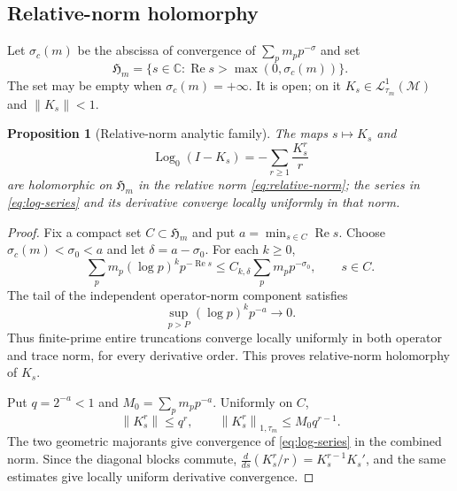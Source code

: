 \documentclass[11pt,a4paper]{article}
\newtheorem{proposition}[theorem]{Proposition}
\theoremstyle{definition}
\newcommand{\C}{\mathbb C}
\newcommand{\M}{\mathcal M}
\newcommand{\Lc}{\mathcal L}
\newcommand{\Log}{\operatorname{Log}}
\newcommand{\norm}[1]{\left\lVert #1\right\rVert}
\begin{document}
\subsection{Relative-norm holomorphy}

Let $\sigma_c(m)$ be the abscissa of convergence of
$\sum_pm_pp^{-\sigma}$ and set
\begin{equation}
 \mathfrak H_m
 =\{s\in\C:\operatorname{Re}s>\max(0,\sigma_c(m))\}.
 \label{eq:Hm}
\end{equation}
The set may be empty when $\sigma_c(m)=+\infty$.  It is open; on it
$K_s\in\Lc^1_{\tau_m}(\M)$ and $\norm{K_s}<1$.

\begin{proposition}[Relative-norm analytic family]
\label{prop:relative-holo}
The maps $s\mapsto K_s$ and
\begin{equation}
 \Log_0(I-K_s)=-\sum_{r\geq1}\frac{K_s^r}{r}
 \label{eq:log-series}
\end{equation}
are holomorphic on $\mathfrak H_m$ in the relative norm
\eqref{eq:relative-norm}; the series in \eqref{eq:log-series} and its
derivative converge locally uniformly in that norm.
\end{proposition}

\begin{proof}
Fix a compact set $C\subset\mathfrak H_m$ and put
$a=\min_{s\in C}\operatorname{Re}s$.  Choose
$\sigma_c(m)<\sigma_0<a$ and let $\delta=a-\sigma_0$.  For each $k\geq0$,
\begin{equation}
 \sum_p m_p(\log p)^kp^{-\operatorname{Re}s}
 \leq C_{k,\delta}\sum_p m_pp^{-\sigma_0},
 \qquad s\in C.
 \label{eq:trace-derivative-bound}
\end{equation}
The tail of the independent operator-norm component satisfies
\begin{equation}
 \sup_{p>P}(\log p)^kp^{-a}\longrightarrow0.
 \label{eq:operator-tail}
\end{equation}
Thus finite-prime entire truncations converge locally uniformly in both
operator and trace norm, for every derivative order.  This proves
relative-norm holomorphy of $K_s$.

Put $q=2^{-a}<1$ and $M_0=\sum_pm_pp^{-a}$.  Uniformly on $C$,
\begin{equation}
 \norm{K_s^r}\leq q^r,
 \qquad
 \norm{K_s^r}_{1,\tau_m}\leq M_0q^{r-1}.
 \label{eq:log-bounds}
\end{equation}
The two geometric majorants give convergence of \eqref{eq:log-series} in the
combined norm.  Since the diagonal blocks commute,
$\frac{d}{ds}(K_s^r/r)=K_s^{r-1}K_s'$, and the same estimates give locally
uniform derivative convergence.
\end{proof}
\end{document}
